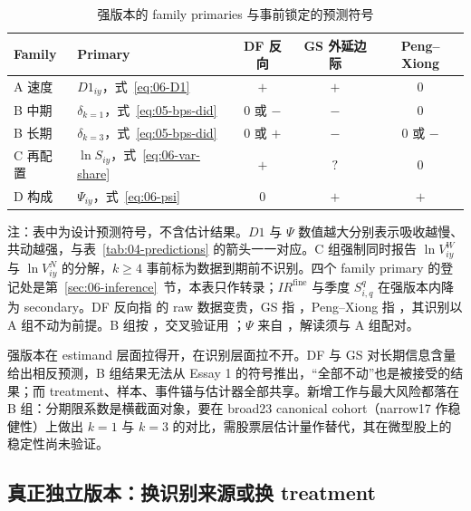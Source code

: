 \documentclass[a4paper,11pt]{ctexart}
\begin{document}
\begin{table}[htbp]
\centering
\begin{threeparttable}
\caption{强版本的 family primaries 与事前锁定的预测符号}\label{tab:11-primaries}
\small
\begin{tabular}{llccc}
\toprule
Family & Primary & DF 反向 & GS 外延边际 & Peng--Xiong \\
\midrule
A 速度 & $D1_{iy}$，式~\eqref{eq:06-D1} & $+$ & $+$ & $0$ \\
B 中期 & $\delta_{k=1}$，式~\eqref{eq:05-bps-did} & $0$ 或 $-$ & $-$ & $0$ \\
B 长期 & $\delta_{k=3}$，式~\eqref{eq:05-bps-did} & $0$ 或 $+$ & $-$ & $0$ 或 $-$ \\
C 再配置 & $\ln S_{iy}$，式~\eqref{eq:06-var-share} & $+$ & $?$ & $0$ \\
D 构成 & $\Psi_{iy}$，式~\eqref{eq:06-psi} & $0$ & $+$ & $+$ \\
\bottomrule
\end{tabular}
\begin{tablenotes}\footnotesize
\item 注：表中为设计预测符号，不含估计结果。$D1$ 与 $\Psi$ 数值越大分别表示吸收越慢、共动越强，与表~\ref{tab:04-predictions} 的箭头一一对应。C 组强制同时报告 $\ln V^{W}_{iy}$ 与 $\ln V^{N}_{iy}$ 的分解，$k\ge4$ 事前标为数据到期前不识别。四个 family primary 的登记处是第~\ref{sec:06-inference}~节，本表只作转录；$IR^{\text{fine}}$ 与季度 $S^{q}_{i,q}$ 在强版本内降为 secondary。DF 反向指 \citet{dugastfoucault2018} 的 raw 数据变贵，GS 指 \citet{grossmanstiglitz1980}，Peng--Xiong 指 \citet{pengxiong2006}，其识别以 A 组不动为前提。B 组按 \citet{baiphilipponsavov2016}，交叉验证用 \citet{davilaparlatore2026}；$\Psi$ 来自 \citet{morckyeungyu2000}，解读须与 A 组配对\citep{roll1988}。
\end{tablenotes}
\end{threeparttable}
\end{table}

强版本在 estimand 层面拉得开，在识别层面拉不开。DF 与 GS 对长期信息含量给出相反预测，B 组结果无法从 Essay 1 的符号推出，“全部不动”也是被接受的结果；而 treatment、样本、事件锚与估计器全部共享。新增工作与最大风险都落在 B 组：分期限系数是横截面对象，要在 broad23 canonical cohort（narrow17 作稳健性）上做出 $k=1$ 与 $k=3$ 的对比，需股票层估计量作替代，其在微型股上的稳定性尚未验证。

\subsection{真正独立版本：换识别来源或换 treatment}\label{sec:11-independent}
\end{document}
